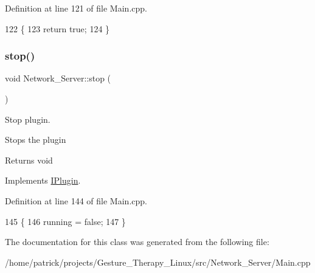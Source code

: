 Definition at line 121 of file Main.\+cpp.


\begin{DoxyCode}
122 \{
123     \textcolor{keywordflow}{return} \textcolor{keyword}{true};
124 \}
\end{DoxyCode}
\mbox{\label{class_network___server_a9a4400df0ce8da4c24c8758201b68562}} 
\subsubsection{\texorpdfstring{stop()}{stop()}}
{\footnotesize\ttfamily void Network\+\_\+\+Server\+::stop (\begin{DoxyParamCaption}{ }\end{DoxyParamCaption})\hspace{0.3cm}{\ttfamily [virtual]}}



Stop plugin. 

Stops the plugin \begin{DoxyReturn}{Returns}
void 
\end{DoxyReturn}


Implements \hyperlink{class_i_plugin_a86e523c283aec5c9fb21249a76e916ac}{I\+Plugin}.



Definition at line 144 of file Main.\+cpp.


\begin{DoxyCode}
145 \{
146     running = \textcolor{keyword}{false};
147 \}
\end{DoxyCode}


The documentation for this class was generated from the following file\+:\begin{DoxyCompactItemize}
\item 
/home/patrick/projects/\+Gesture\+\_\+\+Therapy\+\_\+\+Linux/src/\+Network\+\_\+\+Server/Main.\+cpp\end{DoxyCompactItemize}

